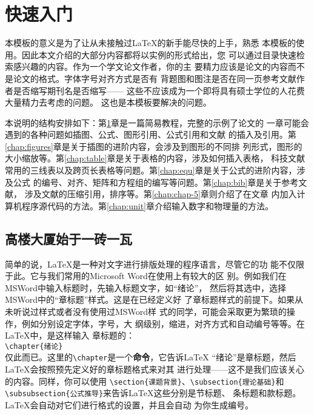\chapter{快速入门}
\label{chap:introduction}

本模板的意义是为了让从未接触过\LaTeX 的新手能尽快的上手，熟悉
本模板的使用。因此本文介绍的大部分内容都将以实例的形式给出，您
可以通过目录快速检索感兴趣的内容。作为一个学文论文作者，你的主
要精力应该是论文的内容而不是论文的格式。字体字号对齐方式是否有
背题图和图注是否在同一页参考文献作者是否缩写期刊名是否缩写——
这些不应该成为一个即将具有硕士学位的人花费大量精力去考虑的问题。
这也是本模板要解决的问题。

本说明的结构安排如下：第\ref{chap:introduction}章是一篇简易教程，完整的示例了论文的
一章可能会遇到的各种问题如插图、公式、图形引用、公式引用和文献
的插入及引用。第\ref{chap:figures}章是关于插图的进阶内容，会涉及到图形的不同排
列形式，图形的大小缩放等。第\ref{chap:table}章是关于表格的内容，涉及如何插入表格，
科技文献常用的三线表以及跨页长表格等问题。第\ref{chap:equ}章是关于公式的进阶内容，涉及公式
的编号、对齐、矩阵和方程组的编写等问题。第\ref{chap:bib}章是关于参考文献，
涉及文献的压缩引用，排序等。第\ref{chap:chap-5}章则介绍了在文章
内加入计算机程序源代码的方法。第\ref{chap:unit}章介绍输入数字和物理量的方法。

\section{高楼大厦始于一砖一瓦}
简单的说，\LaTeX 是一种对文字进行排版处理的程序语言，尽管它的功
能不仅限于此。它与我们常用的Microsoft Word在使用上有较大的区
别。例如我们在MSWord中输入标题时，先输入标题文字，如“绪论”，
然后将其选中，选择MSWord中的“章标题”样式。这是在已经定义好
了章标题样式的前提下。如果从未听说过样式或者没有使用过MSWord样
式的同学，可能会采取更为繁琐的操作，例如分别设定字体，字号，大
纲级别，缩进，对齐方式和自动编号等等。在\LaTeX 中，是这样输入
章标题的：\\[2pt]
\hspace*{5cm}\verb|\chapter{绪论}|\\[2pt]
仅此而已。这里的\verb|\chapter|是一个\textbf{命令}，它告诉\LaTeX
“绪论”是章标题，然后\LaTeX 会按照预先定义好的章标题格式来对其
进行处理——这不是我们应该关心的内容。同样，你可以使用
\verb|\section{课题背景}|、\verb|\subsection{理论基础}|和
\verb|\subsubsection{公式推导}|来告诉\LaTeX 这些分别是节标题、
条标题和款标题。\LaTeX 会自动对它们进行格式的设置，并且会自动
为你生成编号。

